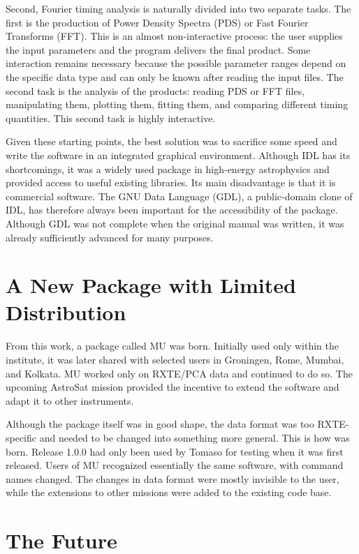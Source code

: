 Second, Fourier timing analysis is naturally divided into two separate tasks.
The first is the production of Power Density Spectra (PDS) or Fast Fourier
Transforms (FFT).  This is an almost non-interactive process: the user supplies
the input parameters and the program delivers the final product.  Some
interaction remains necessary because the possible parameter ranges depend on
the specific data type and can only be known after reading the input files.  The
second task is the analysis of the products: reading PDS or FFT files,
manipulating them, plotting them, fitting them, and comparing different timing
quantities.  This second task is highly interactive.

Given these starting points, the best solution was to sacrifice some speed and
write the software in an integrated graphical environment.  Although IDL has its
shortcomings, it was a widely used package in high-energy astrophysics and
provided access to useful existing libraries.  Its main disadvantage is that it
is commercial software.  The GNU Data Language (GDL), a public-domain clone of
IDL, has therefore always been important for the accessibility of the package.
Although GDL was not complete when the original manual was written, it was
already sufficiently advanced for many \ghats{} purposes.

\section{A New Package with Limited Distribution}

From this work, a package called MU was born.  Initially used only within the
institute, it was later shared with selected users in Groningen, Rome, Mumbai,
and Kolkata.  MU worked only on RXTE/PCA data and continued to do so.  The
upcoming AstroSat mission provided the incentive to extend the software and
adapt it to other instruments.

Although the package itself was in good shape, the data format was too
RXTE-specific and needed to be changed into something more general.  This is how
\ghats{} was born.  Release 1.0.0 had only been used by Tomaso for testing when
it was first released.  Users of MU recognized essentially the same software,
with command names changed.  The changes in data format were mostly invisible
to the user, while the extensions to other missions were added to the existing
code base.

\section{The Future}

